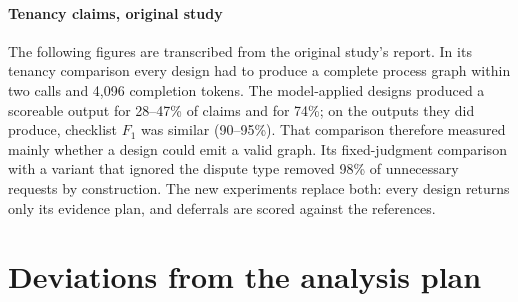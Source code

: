 \paragraph{Tenancy claims, original study}
The following figures are transcribed from the original study's report. In its tenancy comparison every design had to produce a complete process graph within two calls and 4,096 completion tokens. The model-applied designs produced a scoreable output for 28--47\% of claims and \casepath for 74\%; on the outputs they did produce, checklist $F_1$ was similar (90--95\%). That comparison therefore measured mainly whether a design could emit a valid graph. Its fixed-judgment comparison with a variant that ignored the dispute type removed 98\% of unnecessary requests by construction. The new experiments replace both: every design returns only its evidence plan, and deferrals are scored against the references.

\section{Deviations from the analysis plan}
\label{app:deviations}

